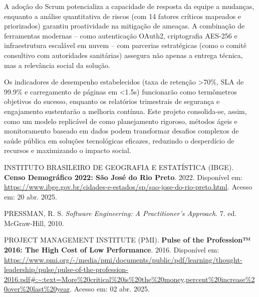 \documentclass[a4paper, 12pt]{article}
\begin{document}
A adoção do Scrum potencializa a capacidade de resposta da equipe a mudanças, enquanto a análise quantitativa de riscos (com 14 fatores críticos mapeados e priorizados) garantiu proatividade na mitigação de ameaças. A combinação de ferramentas modernas – como autenticação OAuth2, criptografia AES-256 e infraestrutura escalável em nuvem – com parcerias estratégicas (como o comitê consultivo com autoridades sanitárias) assegura não apenas a entrega técnica, mas a relevância social da solução.

Os indicadores de desempenho estabelecidos (taxa de retenção >70\%, SLA de 99.9\% e carregamento de páginas em <1.5s) funcionarão como termômetros objetivos do sucesso, enquanto os relatórios trimestrais de segurança e engajamento sustentarão a melhoria contínua. Este projeto consolida-se, assim, como um modelo replicável de como planejamento rigoroso, métodos ágeis e monitoramento baseado em dados podem transformar desafios complexos de saúde pública em soluções tecnológicas eficazes, reduzindo o desperdício de recursos e maximizando o impacto social.


\newpage
\renewcommand{\refname}{Bibliografia}
\begin{thebibliography}{09}
 INSTITUTO BRASILEIRO DE GEOGRAFIA E ESTATÍSTICA (IBGE). 
\textbf{Censo Demográfico 2022: São José do Rio Preto}. 
2022. 
Disponível em: \url{https://www.ibge.gov.br/cidades-e-estados/sp/sao-jose-do-rio-preto.html}. 
Acesso em: 20 abr. 2025.

 PRESSMAN, R. S. \textit{Software Engineering: A Practitioner’s Approach}. 7. ed. McGraw‑Hill, 2010.

 PROJECT MANAGEMENT INSTITUTE (PMI). \textbf{Pulse of the Profession™ 2016: The High Cost of Low Performance}. 2016. Disponível em: \url{https://www.pmi.org/-/media/pmi/documents/public/pdf/learning/thought-leadership/pulse/pulse-of-the-profession-2016.pdf#:~:text=More%20critical%20is%20the%20money,percent%20increase%20over%20last%20year}. Acesso em: 02 abr. 2025.

\end{thebibliography}
\end{document}
